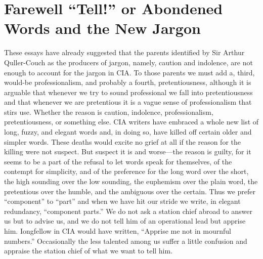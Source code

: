 \documentclass[
    oneside,
    11pt,
]{memoir}
\begin{document}
\chapter{Farewell \enquote{Tell!} or Abondened Words and the New Jargon}

These essays have already suggested that the parents identified by Sir Arthur Quller-Couch as the producers of jargon, namely, caution and indolence, are not enough to account for the jargon in CIA. To those parents we must add a, third,  would-be professionalism, and probably a fourth, pretentiousness, although it is arguable that whenever we try to sound professional we fall into pretentiousness and that whenever we are pretentious it is a vague sense of professionalism that stirs use. Whether the reason is caution, indolence, professionalism, pretentiousness, or something else. CIA writers have embraced a whole new list of long, fuzzy, and elegant words and, in doing so, have killed off certain older and simpler words. These deaths would excite no grief at all if the reason for the killing were not suspect. But suspect it is and worse---the reason is guilty, for it seems to be a part of the refusal to let words speak for themselves, of the contempt for simplicity, and of the preference for the long word over the short, the high sounding over the low sounding, the euphemism over the plain word, the pretentious over the humble, and the ambiguous over the certain. Thus we prefer \enquote{component} to \enquote{part} and when we have hit our stride we write, in elegant redundancy, \enquote{component parts.} We do not ask a station chief abroad to answer us but to advise us, and we do not tell him of an operational lead but apprise him. Iongfellow in CIA would have written, \enquote{Apprise me not in mournful numbers.} Occasionally the less talented among us suffer a little confusion and appraise the station chief of what we want to tell him.
\end{document}
